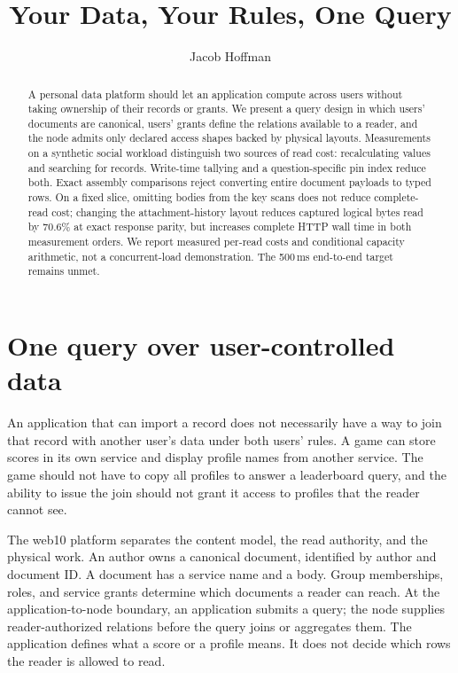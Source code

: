 \documentclass[sigconf,nonacm]{acmart}
\title{Your Data, Your Rules, One Query}
\author{Jacob Hoffman}
\affiliation{\institution{Independent}\country{}}
\begin{document}
\begin{abstract}
A personal data platform should let an application compute across users without taking ownership of their records or grants. We present a query design in which users' documents are canonical, users' grants define the relations available to a reader, and the node admits only declared access shapes backed by physical layouts. Measurements on a synthetic social workload distinguish two sources of read cost: recalculating values and searching for records. Write-time tallying and a question-specific pin index reduce both. Exact assembly comparisons reject converting entire document payloads to typed rows. On a fixed slice, omitting bodies from the key scans does not reduce complete-read cost; changing the attachment-history layout reduces captured logical bytes read by 70.6\% at exact response parity, but increases complete HTTP wall time in both measurement orders. We report measured per-read costs and conditional capacity arithmetic, not a concurrent-load demonstration. The 500\,ms end-to-end target remains unmet.
\end{abstract}
\maketitle

\section{One query over user-controlled data}
An application that can import a record does not necessarily have a way to join that record with another user's data under both users' rules. A game can store scores in its own service and display profile names from another service. The game should not have to copy all profiles to answer a leaderboard query, and the ability to issue the join should not grant it access to profiles that the reader cannot see.

The web10 platform separates the content model, the read authority, and the physical work. An author owns a canonical document, identified by author and document ID. A document has a service name and a body. Group memberships, roles, and service grants determine which documents a reader can reach. At the application-to-node boundary, an application submits a query; the node supplies reader-authorized relations before the query joins or aggregates them. The application defines what a score or a profile means. It does not decide which rows the reader is allowed to read.
\end{document}
